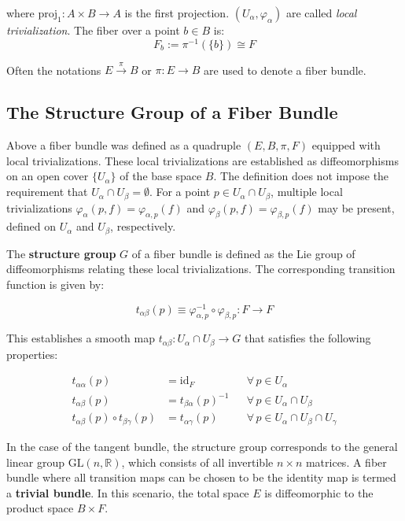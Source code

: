 where $\text{proj}_1: A \times B \to A$ is the first projection. $(U_\alpha, \varphi_\alpha)$ are called \emph{local trivialization}. The fiber over a point $b \in B$ is:
\[
F_b := \pi^{-1}(\{b\}) \cong F
\]

Often the notations $E \xrightarrow{\pi} B$ or $\pi : E \to B$ are used to denote a fiber bundle.


\subsection{The Structure Group of a Fiber Bundle}

Above a fiber bundle was defined as a quadruple \((E, B, \pi, F)\) equipped with local trivializations. These local trivializations are established as diffeomorphisms on an open cover $\{U_\alpha\}$ of the base space \(B\). The definition does not impose the requirement that \(U_\alpha \cap U_\beta = \emptyset\). For a point \(p \in U_\alpha \cap U_\beta\), multiple local trivializations \(\varphi_\alpha(p, f) = \varphi_{\alpha,p}(f)\) and \(\varphi_\beta(p, f) = \varphi_{\beta,p}(f)\) may be present, defined on \(U_\alpha\) and \(U_\beta\), respectively.

The \textbf{structure group} \(G\) of a fiber bundle is defined as the Lie group of diffeomorphisms relating these local trivializations. The corresponding transition function is given by\cite{NakaharaGeometrytopologyphysics2005}:

\[
t_{\alpha\beta}(p) \equiv \varphi_{\alpha,p}^{-1} \circ \varphi_{\beta,p} : F \to F
\]

This establishes a smooth map \(t_{\alpha\beta}: U_\alpha \cap U_\beta \to G\) that satisfies the following properties:

\begin{align*}
  t_{\alpha \alpha}(p) &= \mathrm{id}_F && \forall\, p \in U_\alpha \\
  t_{\alpha\beta}(p) &= t_{\beta\alpha}(p)^{-1} && \forall\, p \in U_\alpha \cap U_\beta \\
  t_{\alpha\beta}(p) \circ t_{\beta\gamma}(p) &= t_{\alpha\gamma}(p) && \forall\, p \in U_\alpha \cap U_\beta \cap U_\gamma
\end{align*}

In the case of the tangent bundle, the structure group corresponds to the general linear group \(\mathrm{GL}(n, \mathbb{R})\), which consists of all invertible \(n \times n\) matrices. 
A fiber bundle where all transition maps can be chosen to be the identity map is termed a \textbf{trivial bundle}. In this scenario, the total space \(E\) is diffeomorphic to the product space \(B \times F\). 

